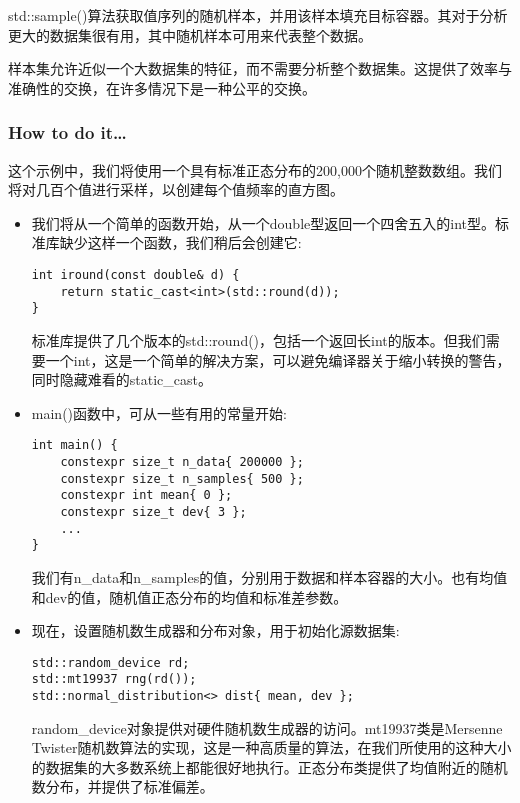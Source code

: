 
std::sample()算法获取值序列的随机样本，并用该样本填充目标容器。其对于分析更大的数据集很有用，其中随机样本可用来代表整个数据。

样本集允许近似一个大数据集的特征，而不需要分析整个数据集。这提供了效率与准确性的交换，在许多情况下是一种公平的交换。

\subsubsection{How to do it…}

这个示例中，我们将使用一个具有标准正态分布的200,000个随机整数数组。我们将对几百个值进行采样，以创建每个值频率的直方图。

\begin{itemize}
\item 
我们将从一个简单的函数开始，从一个double型返回一个四舍五入的int型。标准库缺少这样一个函数，我们稍后会创建它:

\begin{lstlisting}[style=styleCXX]
int iround(const double& d) {
	return static_cast<int>(std::round(d));
}
\end{lstlisting}

标准库提供了几个版本的std::round()，包括一个返回长int的版本。但我们需要一个int，这是一个简单的解决方案，可以避免编译器关于缩小转换的警告，同时隐藏难看的static\_cast。

\item 
main()函数中，可从一些有用的常量开始:

\begin{lstlisting}[style=styleCXX]
int main() {
	constexpr size_t n_data{ 200000 };
	constexpr size_t n_samples{ 500 };
	constexpr int mean{ 0 };
	constexpr size_t dev{ 3 };
	...
}
\end{lstlisting}

我们有n\_data和n\_samples的值，分别用于数据和样本容器的大小。也有均值和dev的值，随机值正态分布的均值和标准差参数。

\item 
现在，设置随机数生成器和分布对象，用于初始化源数据集:

\begin{lstlisting}[style=styleCXX]
std::random_device rd;
std::mt19937 rng(rd());
std::normal_distribution<> dist{ mean, dev };
\end{lstlisting}

random\_device对象提供对硬件随机数生成器的访问。mt19937类是Mersenne Twister随机数算法的实现，这是一种高质量的算法，在我们所使用的这种大小的数据集的大多数系统上都能很好地执行。正态分布类提供了均值附近的随机数分布，并提供了标准偏差。


\end{itemize}

